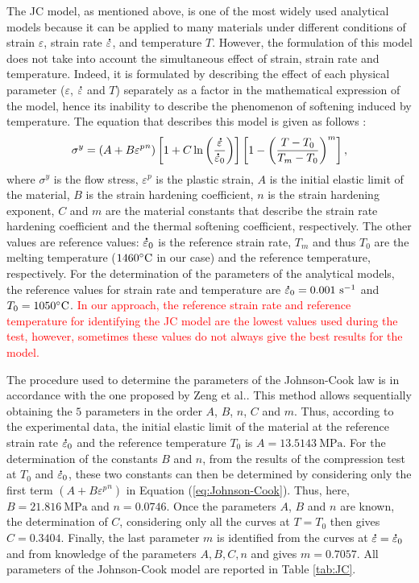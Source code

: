 \documentclass[metals,article,submit,pdftex,moreauthors]{Definitions/mdpi}
\makeatletter
\DeclareRobustCommand{\mdot}[1]{\accentset{\mbox{\bfseries .}}{#1}}
\DeclareRobustCommand{\eal}{et al.\@\xspace}
\DeclareRobustCommand{\ps}{\text{s}^{-1}}
\DeclareRobustCommand{\MPa}{\text{MPa}}
\makeatother
\begin{document}
The JC model, as mentioned above, is one of the most widely used analytical models because it can be applied to many materials under different conditions of strain $\varepsilon$, strain rate $\mdot\varepsilon$, and temperature $T$.
However, the formulation of this model does not take into account the simultaneous effect of strain, strain rate and temperature.
Indeed, it is formulated by describing the effect of each physical parameter ($\varepsilon$, $\mdot\varepsilon$ and $T$) separately as a factor in the mathematical expression of the model, hence its inability to describe the phenomenon of softening induced by temperature.
The equation that describes this model is given as follows \cite{Johnson-1983}:
\begin{equation}
\sigma^y=\left(A+B{\varepsilon^p}^{n}\right) \left[1+C\ln\left(\frac{\mdot\varepsilon}{\mdot\varepsilon_0}\right)\right] \left[1-\left(\frac{T-T_0}{T_m-T_0}\right)^{m}\right],\label{eq:Johnson-Cook}
\end{equation}
where $\sigma^y$ is the flow stress, $\varepsilon^p$ is the plastic strain, $A$ is the initial elastic limit of the material, $B$ is the strain hardening coefficient, $n$ is the strain hardening exponent, $C$ and $m$ are the material constants that describe the strain rate hardening coefficient and the thermal softening coefficient, respectively.
The other values are reference values: $\mdot\varepsilon_0$ is the reference strain rate, $T_m$ and thus $T_0$ are the melting temperature ($1460\celsius$ in our case) and the reference temperature, respectively.
For the determination of the parameters of the analytical models, the reference values for strain rate and temperature are $\mdot\varepsilon_0=0.001~\ps$ and $T_0=1050\celsius$.
\textcolor{red}{In our approach, the reference strain rate and reference temperature for identifying the JC model are the lowest values used during the test, however, sometimes these values do not always give the best results for the model.}

The procedure used to determine the parameters of the Johnson-Cook law is in accordance with the one proposed by Zeng \eal \cite{zeng2022constitutive}.
This method allows sequentially obtaining the $5$ parameters in the order $A$, $B$, $n$, $C$ and $m$.
Thus, according to the experimental data, the initial elastic limit of the material at the reference strain rate $\mdot\varepsilon_0$ and the reference temperature $T_0$ is $A=13.5143~\MPa$.
For the determination of the constants $B$ and $n$, from the results of the compression test at $T_0$ and $\mdot\varepsilon_0$, these two constants can then be determined by considering only the first term $\left(A+B{\varepsilon^p}^{n}\right)$ in Equation (\ref{eq:Johnson-Cook}).
Thus, here, $B=21.816~\MPa$ and $n=0.0746$.
Once the parameters $A$, $B$ and $n$ are known, the determination of $C$, considering only all the curves at $T=T_0$ then gives $C=0.3404$.
Finally, the last parameter $m$ is identified from the curves at $\mdot\varepsilon=\mdot\varepsilon_0$ and from knowledge of the parameters $A, B, C, n$ and gives $m=0.7057$.
All parameters of the Johnson-Cook model are reported in Table \ref{tab:JC}.
\end{document}

